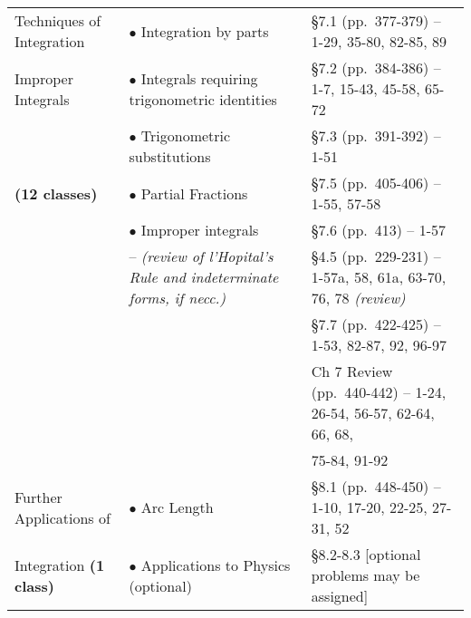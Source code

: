 {\begin{landscape}
\begin{longtable}[t]{||p{1.75in}|p{4.5in}|p{3.75in}||}
Techniques of Integration
	& $\bullet$ Integration by parts
	& \S 7.1 (pp.~377-379) -- 1-29, 35-80, 82-85, 89
\\ Improper Integrals
	& $\bullet$ Integrals requiring trigonometric identities
	& \S 7.2 (pp.~384-386) -- 1-7, 15-43, 45-58, 65-72
\\
	& $\bullet$ Trigonometric substitutions
	& \S 7.3 (pp.~391-392) -- 1-51
\\ \textbf{(12 classes)}
	& $\bullet$ Partial Fractions
	& \S 7.5 (pp.~405-406) -- 1-55, 57-58
\\
	& $\bullet$ Improper integrals
	& \S 7.6 (pp.~413) -- 1-57
\\
	& \hspace{0.1in}-- \textit{(review of l'Hopital's Rule and indeterminate forms, if necc.)}
	&  \S 4.5 (pp.~229-231) -- 1-57a, 58, 61a, 63-70, 76, 78 \textit{(review)}
\\
	&
	& \S 7.7 (pp.~422-425) -- 1-53, 82-87, 92, 96-97
\\
	&
	& Ch 7 Review (pp.~440-442) -- 1-24, 26-54, 56-57, 62-64, 66, 68,
\\
	&
	& \phantom{Ch 7 Review (pp.~440-442) -- }75-84, 91-92
\\ \hline

Further Applications of
	& $\bullet$ Arc Length
	& \S 8.1 (pp.~448-450) -- 1-10, 17-20, 22-25, 27-31, 52
\\ Integration \textbf{(1 class)}
	& $\bullet$ Applications to Physics (optional)
	& \S 8.2-8.3 [optional problems may be assigned]
\\ \hline


\end{longtable}
\end{landscape}}
